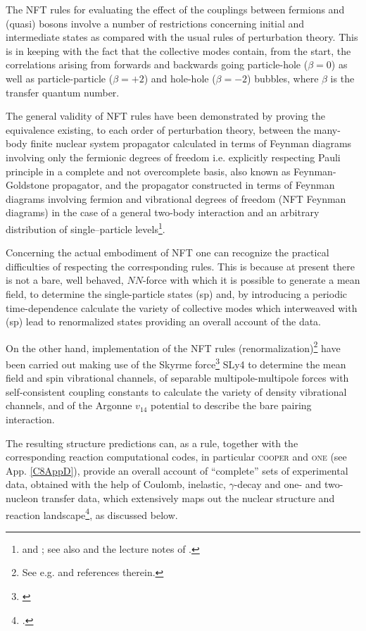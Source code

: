 The NFT rules  for evaluating the effect of the couplings between fermions and (quasi) bosons involve a number of restrictions concerning initial and intermediate states as compared with the usual rules of perturbation theory. This is in keeping with the fact that the collective modes contain, from the start,  the correlations arising from forwards and backwards going  particle-hole ($\beta=0$) as well as particle-particle ($\beta=+2$) and hole-hole ($\beta=-2$) bubbles, where $\beta$ is the transfer quantum number. 
 

The general validity of NFT rules have been demonstrated by proving the equivalence existing, to each order of perturbation theory, between the many-body finite nuclear system propagator calculated in terms of Feynman diagrams involving only the fermionic degrees of freedom i.e. explicitly respecting Pauli principle in a complete and not overcomplete basis, also known as Feynman-Goldstone propagator, and the propagator constructed in terms of Feynman diagrams involving fermion and vibrational degrees of freedom (NFT Feynman diagrams) in the case of a general two-body interaction and an arbitrary distribution of single--particle levels\footnote{\cite{Bes:75} and \cite{Bes:76c}; see also \cite{Baranger:69} and the  lecture notes of  \cite{McFarlane:69}.}.



 Concerning the actual embodiment of NFT one can recognize the practical difficulties of respecting the corresponding rules. This is because at present there is not a  bare, well behaved, $NN$-force  with which it is possible to generate a mean field,  to determine the single-particle states (sp)  and, by introducing a periodic time-dependence calculate the variety of collective modes which interweaved with (sp) lead to renormalized states providing an overall account of the data. 



On the other hand,  implementation of the NFT rules (renormalization)\footnote{See e.g. \cite{Broglia:16} and references therein.} have been carried out making use of the Skyrme  force\footnote{\cite{Chabanat:97}} SLy4 to determine the mean field and spin vibrational channels,  of separable multipole-multipole forces with self-consistent  coupling constants to calculate the variety of density vibrational channels, and of the  Argonne $v_{14}$ potential to describe the bare pairing interaction.


The resulting structure predictions can, as a rule,  together with the corresponding reaction computational codes, in particular \textsc{cooper} and \textsc{one} (see App. \ref{C8AppD}), provide an overall account of ``complete'' sets of experimental data, obtained with the help of Coulomb, inelastic, $\gamma$-decay  and one- and two-nucleon transfer data, which  extensively maps out the nuclear structure and reaction landscape\footnote{\cite{Idini:15,Idini:14,Potel:13}.}, as discussed below.


